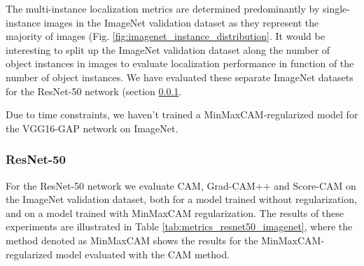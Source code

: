 The multi-instance localization metrics are determined predominantly by single-instance images in the ImageNet validation dataset as they represent the majority of images (Fig. \ref{fig:imagenet_instance_distribution}. It would be interesting to split up the ImageNet validation dataset along the number of object instances in images to evaluate localization performance in function of the number of object instances. We have evaluated these separate ImageNet datasets for the ResNet-50 network (section \ref{sec:exp_resnet50_imagenet}.

Due to time constraints, we haven't trained a MinMaxCAM-regularized model for the VGG16-GAP network on ImageNet.

\subsubsection{ResNet-50} \label{sec:exp_resnet50_imagenet}

For the ResNet-50 network we evaluate CAM, Grad-CAM++ and Score-CAM on the ImageNet validation dataset, both for a model trained without regularization, and on a model trained with MinMaxCAM regularization. The results of these experiments are illustrated in Table \ref{tab:metrics_resnet50_imagenet}, where the method denoted as MinMaxCAM shows the results for the MinMaxCAM-regularized model evaluated with the CAM method. 

